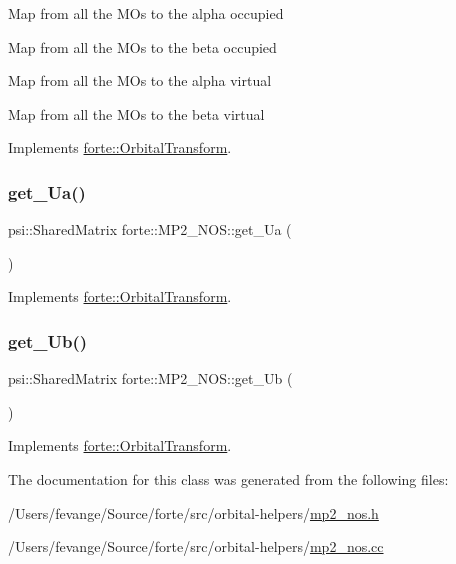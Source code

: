 Map from all the M\+Os to the alpha occupied

Map from all the M\+Os to the beta occupied

Map from all the M\+Os to the alpha virtual

Map from all the M\+Os to the beta virtual 

Implements \mbox{\hyperlink{classforte_1_1_orbital_transform_a48704cbce9fd066ef7e58270bb413c25}{forte\+::\+Orbital\+Transform}}.

\mbox{\label{classforte_1_1_m_p2___n_o_s_a7210e806a978b617b5b848dba3628726}} 
\subsubsection{\texorpdfstring{get\+\_\+\+Ua()}{get\_Ua()}}
{\footnotesize\ttfamily psi\+::\+Shared\+Matrix forte\+::\+M\+P2\+\_\+\+N\+O\+S\+::get\+\_\+\+Ua (\begin{DoxyParamCaption}{ }\end{DoxyParamCaption})\hspace{0.3cm}{\ttfamily [virtual]}}



Implements \mbox{\hyperlink{classforte_1_1_orbital_transform_aedd124480b35eba56653109578c05ec9}{forte\+::\+Orbital\+Transform}}.

\mbox{\label{classforte_1_1_m_p2___n_o_s_a2bb9cdbac921a47dd31b6796c8c8daa1}} 
\subsubsection{\texorpdfstring{get\+\_\+\+Ub()}{get\_Ub()}}
{\footnotesize\ttfamily psi\+::\+Shared\+Matrix forte\+::\+M\+P2\+\_\+\+N\+O\+S\+::get\+\_\+\+Ub (\begin{DoxyParamCaption}{ }\end{DoxyParamCaption})\hspace{0.3cm}{\ttfamily [virtual]}}



Implements \mbox{\hyperlink{classforte_1_1_orbital_transform_aeb179f5b68883cf346dde354c05fd27b}{forte\+::\+Orbital\+Transform}}.



The documentation for this class was generated from the following files\+:\begin{DoxyCompactItemize}
\item 
/\+Users/fevange/\+Source/forte/src/orbital-\/helpers/\mbox{\hyperlink{mp2__nos_8h}{mp2\+\_\+nos.\+h}}\item 
/\+Users/fevange/\+Source/forte/src/orbital-\/helpers/\mbox{\hyperlink{mp2__nos_8cc}{mp2\+\_\+nos.\+cc}}\end{DoxyCompactItemize}
